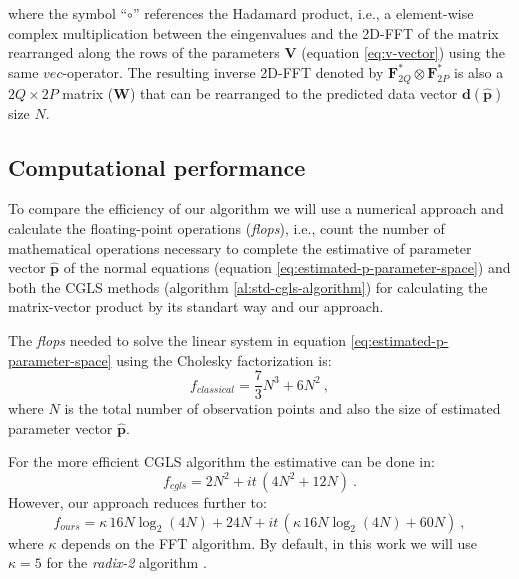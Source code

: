 where the symbol ``$\circ$'' references the Hadamard product, i.e., a element-wise complex multiplication between the eingenvalues and the 2D-FFT of the matrix rearranged along the rows of the parameters $\mathbf{V}$ (equation \ref{eq:v-vector}) using the same $vec$-operator. The resulting inverse 2D-FFT denoted by $\mathbf{F}_{2Q}^{\ast}  \otimes \mathbf{F}_{2P}^{\ast}$ is also a $2Q \times 2P$ matrix ($\mathbf{W}$) that can be rearranged to the predicted data vector $\mathbf{d}(\hat{\mathbf{p}})$ size $N$.

\subsection{Computational performance}

To compare the efficiency of our algorithm we will use a numerical approach and calculate the floating-point operations (\emph{flops}), i.e., count the number of mathematical operations necessary to complete the estimative of parameter vector $\mathbf{\hat{p}}$ of the normal equations (equation \ref{eq:estimated-p-parameter-space}) and both the CGLS methods (algorithm \ref{al:std-cgls-algorithm}) for calculating the matrix-vector product by its standart way and our approach.

The \emph{flops} needed to solve the linear system in equation \ref{eq:estimated-p-parameter-space} using the Cholesky factorization is:
\begin{equation}
f_{classical} =  \dfrac{7}{3} N^{3} + 6 N^{2}\: ,
\label{eq:flops-normal-cholesky}
\end{equation}
where $N$ is the total number of observation points and also the size of estimated parameter vector $\mathbf{\hat{p}}$.

For the more efficient CGLS algorithm the estimative can be done in:
\begin{equation}
f_{cgls} =  2 N^{2} + it \, (4 N^{2} + 12 N) \: .
\label{eq:flops-cgls}
\end{equation}
However, our approach reduces further to:
\begin{equation}
f_{ours} =  \kappa  \, 16 N \log_2(4 N) + 24 N + it \, (\kappa  \, 16 N \log_2 (4 N) + 60 N) \: ,
\label{eq:flops-cgls-bccb}
\end{equation}
where $\kappa$ depends on the FFT algorithm. By default, in this work we will use $\kappa = 5$ for the \emph{radix-2} algorithm \citep{vanloan1992}.

